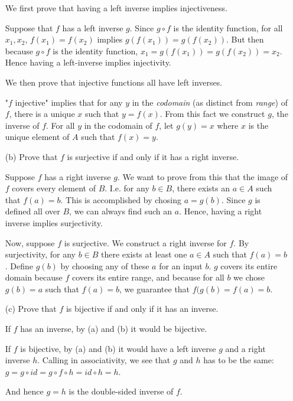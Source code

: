 \documentclass[12pt]{article} %
\begin{document}
\begin{flushleft}
\begin{itemize}
  We first prove that having a left inverse implies injectiveness.
  
  Suppose that $f$ has a left inverse $g$. Since $g\circ f$ is the identity function, for all $x_1, x_2$, $f(x_1) = f(x_2)$ implies $g(f(x_1)) = g(f(x_2))$. But then because $g\circ f$ is the identity function, $x_1 = g(f(x_1)) = g(f(x_2)) = x_2$. Hence having a left-inverse implies injectivity.

  We then prove that injective functions all have left inverses. 

  "$f$ injective" implies that for any $y$ in the \textit{codomain} (as distinct from \textit{range}) of $f$, there is a unique $x$ such that $y=f(x)$. From this fact we construct $g$, the inverse of $f$. For all $y$ in the codomain of $f$, let $g(y) = x$ where $x$ is the unique element of $A$ such that $f(x) = y$.

 \item[(b)] Prove that $f$ is surjective if and only if it has a right inverse.

  Suppose $f$ has a right inverse $g$. We want to prove from this that the image of $f$ covers every element of $B$. I.e. for any $b\in B$, there exists an $a\in A$ such that $f(a) = b$. This is accomplished by chosing $a=g(b)$. Since $g$ is defined all over $B$, we can always find such an $a$. Hence, having a right inverse implies surjectivity.

  Now, suppose $f$ is surjective. We construct a right inverse for $f$. By surjectivity, for any $b\in B$ there exists at least one $a\in A$ such that $f(a) = b$. Define $g(b)$ by choosing any of these $a$ for an input $b$. $g$ covers its entire domain because $f$ covers its entire range, and because for all $b$ we chose $g(b) = a$ such that $f(a) = b$, we guarantee that $f(g(b) = f(a) = b$.

 \item[(c)] Prove that $f$ is bijective if and only if it has an inverse.

  If $f$ has an inverse, by (a) and (b) it would be bijective.

  If $f$ is bijective, by (a) and (b) it would have a left inverse  $g$ and a right inverse $h$. Calling in associativity, we see that $g$ and $h$ has to be the same:
  $ g = g \circ id  = g\circ f \circ h = id\circ h = h$.
  
  And hence $g=h$ is the double-sided inverse of $f$.
\end{itemize}


\end{flushleft}
\end{document}
